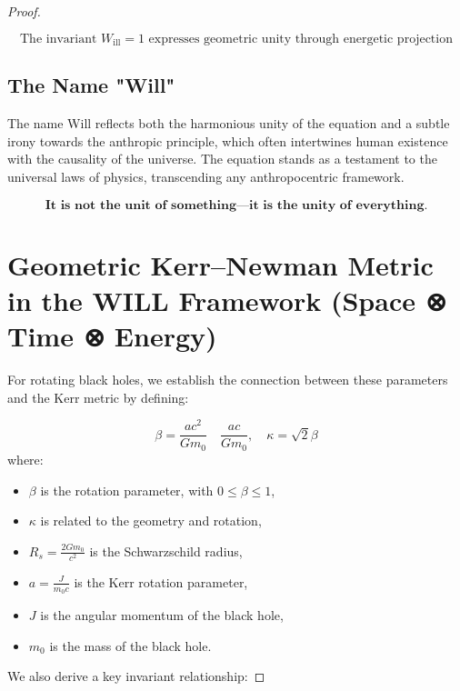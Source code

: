 \documentclass{article}
\begin{document}
\begin{proof}
\begin{tcolorbox}[colback=gray!5, colframe=black!80!black, title=Geometric Unity]
\[
\boxed{\text{The invariant } W_{\text{ill}} = 1 \text{ expresses geometric unity through energetic projection}}
\]
\end{tcolorbox}


\subsection{The Name "Will"}
The name Will reflects both the harmonious unity of the equation and a subtle irony towards the anthropic principle, which often intertwines human existence with the causality of the universe. The equation stands as a testament to the universal laws of physics, transcending any anthropocentric framework.


\begin{tcolorbox}[colback=gray!5, colframe=black!80!black, title=Will]
\[
\boxed{
\textbf{It is not the unit of something—it is the unity of everything.}
}
\]
\end{tcolorbox}



\section{Geometric Kerr–Newman Metric in the WILL Framework  (Space ⊗ Time ⊗ Energy)}

For rotating black holes, we establish the connection between these parameters and the Kerr metric by defining:

\[
\beta =\frac{ac^{2}}{Gm_{0}}  \quad \frac{a c}{G m_0}, \quad \kappa = \sqrt{2} \beta
\]
where:
\begin{itemize}
    \item \(\beta\) is the rotation parameter, with \(0 \leq \beta \leq 1\),
    \item \(\kappa\) is related to the geometry and rotation,
    \item \(R_s = \frac{2 G m_0}{c^2}\) is the Schwarzschild radius,
    \item \(a = \frac{J}{m_0 c}\) is the Kerr rotation parameter,
    \item \(J\) is the angular momentum of the black hole,
    \item \(m_0\) is the mass of the black hole.
\end{itemize}

We also derive a key invariant relationship:


\end{proof}
\end{document}
